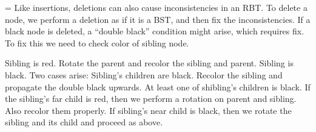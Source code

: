 \headline=\header
{}
\vskip 1cm
\textfont\baselineskip16pt
Like insertions, deletions can also cause inconsistencies in an RBT. To delete a node, we perform a deletion
as if it is a BST, and then fix the inconsistencies. If a black node is deleted, a ``double black''
condition might arise, which requires fix. To fix this we need to check color of sibling node.

\numberedlist
\li Sibling is red. Rotate the parent and recolor the sibling and parent.
\li Sibling is black. Two cases arise:
    \numberedlist
    \li Sibling's children are black. Recolor the sibling and propagate the double black upwards.
    \li At least one of shibling's children is black.
        \numberedlist
        \li If the sibling's far child is red, then we perform a rotation on parent and sibling. Also
        recolor them properly.
        \li If sibling's near child is black, then we rotate the sibling and its child and proceed as above.
        \endnumberedlist
    \endnumberedlist
\endnumberedlist
\bye

